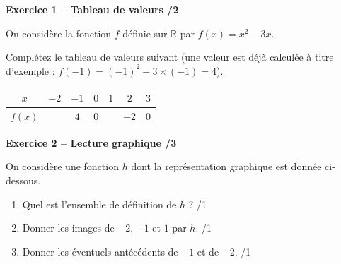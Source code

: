 \documentclass[10pt,a4paper]{article}
\begin{document}
\newpage



\textbf{Exercice 1 -- Tableau de valeurs \hfill /2}

On considère la fonction \(f\) définie sur \(\mathbb{R}\) par \(f(x)=x^2-3x\).

Complétez le tableau de valeurs suivant (une valeur est déjà calculée à titre d'exemple : \(f(-1)=(-1)^2-3\times(-1)=4\)).

\begin{center}
    \renewcommand{\arraystretch}{1.5}
    \setlength{\tabcolsep}{0.25cm}
    \begin{tabular}{|*{7}{c|}}
    \hline
    \(x\) & \(-2\) & \(-1\) & \(0\) & \(1\) & \(2\) & \(3\) \\
    \hline
    \(f(x)\) & & \(4\) & \(0\) & & \(-2\) & \(0\) \\
    \hline
    \end{tabular}
\end{center}

\vspace{3cm}

\textbf{Exercice 2 -- Lecture graphique \hfill /3}

On considère une fonction \(h\) dont la représentation graphique est donnée ci-dessous.

\begin{center}
\end{center}

\begin{enumerate}
    \item Quel est l'ensemble de définition de \(h\) ? \hfill /1
    \item Donner les images de \(-2\), \(-1\) et \(1\) par \(h\). \hfill /1
    \item Donner les éventuels antécédents de \(-1\) et de \(-2\). \hfill /1
\end{enumerate}
\end{document}
